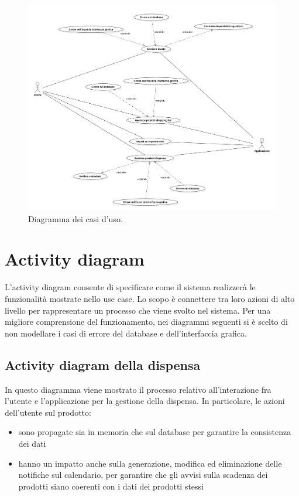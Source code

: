 \begin{figure}[H]
    \includegraphics[width=\linewidth]{images/use-case.png}
    \caption{Diagramma dei casi d'uso.}
    \label{fig:usecase}
\end{figure}

\newpage

\section{Activity diagram}

L'activity diagram consente di specificare come il sistema realizzerà le funzionalità mostrate nello use case. Lo scopo è connettere tra loro azioni di alto livello per rappresentare un processo che viene svolto nel sistema. Per una migliore comprensione del funzionamento, nei diagrammi seguenti si è scelto di non modellare i casi di errore del database e dell'interfaccia grafica. 

\subsection{Activity diagram della dispensa}

In questo diagramma viene mostrato il processo relativo all'interazione fra l'utente e l'applicazione per la gestione della dispensa.
In particolare, le azioni dell'utente sul prodotto:
\begin{itemize} 
    \item sono propagate sia in memoria che sul database per garantire la consistenza dei dati
    \item hanno un impatto anche sulla generazione, modifica ed eliminazione delle notifiche sul calendario, per garantire che gli avvisi sulla scadenza dei prodotti siano coerenti con i dati dei prodotti stessi 
\end{itemize}


